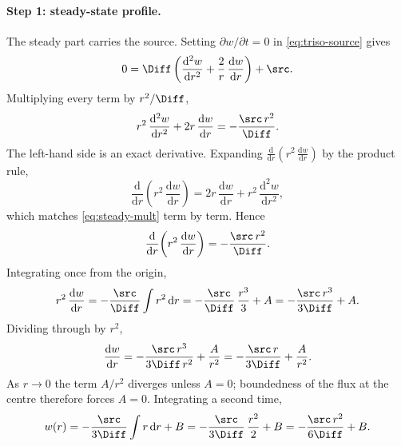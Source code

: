 \paragraph{Step 1: steady-state profile.}
The steady part carries the source. Setting $\partial w/\partial t = 0$ in
\cref{eq:triso-source} gives
%
\begin{equation}
  0 = \Diff \left( \frac{\mathrm{d}^{2} w}{\mathrm{d}r^{2}}
    + \frac{2}{r}\,\frac{\mathrm{d}w}{\mathrm{d}r} \right) + \src .
  \label{eq:steady-ode}
\end{equation}
%
Multiplying every term by $r^{2}/\Diff$,
%
\begin{equation}
  r^{2}\,\frac{\mathrm{d}^{2} w}{\mathrm{d}r^{2}}
  + 2r\,\frac{\mathrm{d}w}{\mathrm{d}r}
  = -\frac{\src\, r^{2}}{\Diff} .
  \label{eq:steady-mult}
\end{equation}
%
The left-hand side is an exact derivative. Expanding
$\frac{\mathrm{d}}{\mathrm{d}r}\!\left( r^{2}\,\frac{\mathrm{d}w}{\mathrm{d}r} \right)$
by the product rule,
%
\begin{equation}
  \frac{\mathrm{d}}{\mathrm{d}r}\!\left( r^{2}\,\frac{\mathrm{d}w}{\mathrm{d}r} \right)
  = 2r\,\frac{\mathrm{d}w}{\mathrm{d}r}
  + r^{2}\,\frac{\mathrm{d}^{2} w}{\mathrm{d}r^{2}} ,
\end{equation}
%
which matches \cref{eq:steady-mult} term by term. Hence
%
\begin{equation}
  \frac{\mathrm{d}}{\mathrm{d}r}\!\left( r^{2}\,\frac{\mathrm{d}w}{\mathrm{d}r} \right)
  = -\frac{\src\, r^{2}}{\Diff} .
\end{equation}
%
Integrating once from the origin,
%
\begin{equation}
  r^{2}\,\frac{\mathrm{d}w}{\mathrm{d}r}
  = -\frac{\src}{\Diff} \int r^{2}\,\mathrm{d}r
  = -\frac{\src}{\Diff}\,\frac{r^{3}}{3} + A
  = -\frac{\src\, r^{3}}{3\Diff} + A .
\end{equation}
%
Dividing through by $r^{2}$,
%
\begin{equation}
  \frac{\mathrm{d}w}{\mathrm{d}r}
  = -\frac{\src\, r^{3}}{3\Diff\, r^{2}} + \frac{A}{r^{2}}
  = -\frac{\src\, r}{3\Diff} + \frac{A}{r^{2}} .
\end{equation}
%
As $r \to 0$ the term $A/r^{2}$ diverges unless $A = 0$; boundedness of the flux at
the centre therefore forces $A = 0$. Integrating a second time,
%
\begin{equation}
  w(r) = -\frac{\src}{3\Diff} \int r\,\mathrm{d}r + B
  = -\frac{\src}{3\Diff}\,\frac{r^{2}}{2} + B
  = -\frac{\src\, r^{2}}{6\Diff} + B .
\end{equation}
